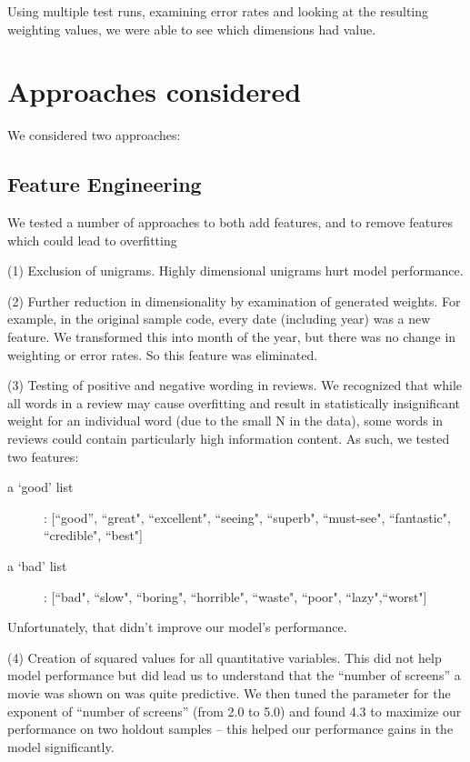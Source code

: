 \documentclass[11pt, oneside]{article}   	%
\begin{document}
Using multiple test runs, examining error rates and looking at the resulting weighting values, we were able to see which dimensions had value.



\section*{Approaches considered}
We considered two approaches: 


\subsection*{Feature Engineering}
We tested a number of approaches to both add features, and to remove features which could lead to overfitting

(1) Exclusion of unigrams.  Highly dimensional unigrams hurt model performance.

(2) Further reduction in dimensionality by examination of generated weights. For example, in the original sample code, every date (including year) was a new feature. We transformed this into month of the year, but there was no change in weighting or error rates. So this feature was eliminated.

(3) Testing of positive and negative wording in reviews. We recognized that while all words in a review may cause overfitting and result in statistically insignificant weight for an individual word (due to the small N in the data), some words in reviews could contain particularly high information content. As such, we tested two features:
\begin{description}
  \item[a `good' list]: [``good'', ``great", ``excellent", ``seeing", ``superb", ``must-see", ``fantastic", ``credible", ``best"]
  \item[a `bad' list]: [``bad", ``slow", ``boring", ``horrible", ``waste", ``poor", ``lazy",``worst"]
\end{description}
Unfortunately, that didn't improve our model's performance.

(4) Creation of squared values for all quantitative variables. This did not help model performance but did lead us to understand that the ``number of screens'' a movie was shown on was quite predictive. We then tuned the parameter for the exponent of ``number of screens'' (from 2.0 to 5.0) and found 4.3 to maximize our performance on two holdout samples -- this helped our performance gains in the model significantly.
\end{document}
